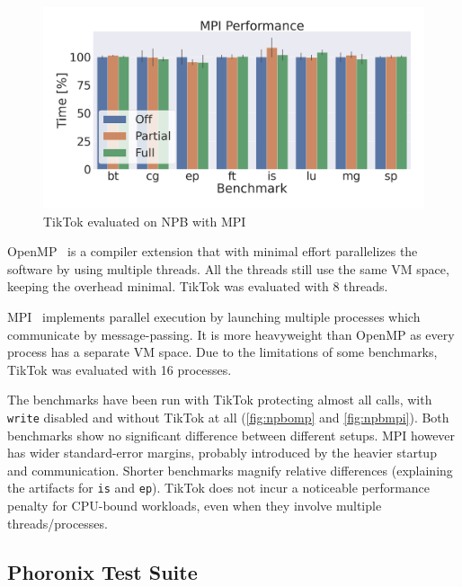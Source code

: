 \documentclass[conference]{IEEEtran}
\newcommand{\sysname}{TikTok}
\begin{document}
\begin{figure}[]
  \centering
  \includegraphics[width=\linewidth]{graphs/mpi.png}
  \caption{\sysname{} evaluated on NPB with MPI}
  \label{fig:npbmpi}
\end{figure}


OpenMP~\cite{dagum1998openmp} is a compiler extension that with minimal effort
parallelizes the software by using multiple threads. All the threads still use
the same VM space, keeping the overhead minimal. \sysname{} was evaluated with 8
threads.

MPI~\cite{snir1998mpi} implements parallel execution by launching multiple
processes which communicate by message-passing. It is more heavyweight than
OpenMP as every process has a separate VM space. Due to the limitations of some
benchmarks, \sysname{} was evaluated with 16 processes.

The benchmarks have been run with \sysname{} protecting almost all calls, with
\texttt{write} disabled and without \sysname{} at all (\autoref{fig:npbomp} and
\autoref{fig:npbmpi}). Both benchmarks show no significant difference between
different setups. MPI however has wider standard-error margins, probably
introduced by the heavier startup and communication. Shorter benchmarks magnify
relative differences (explaining the artifacts for \texttt{is} and \texttt{ep}).
\sysname{} does not incur a noticeable performance
penalty for CPU-bound workloads, even when they involve multiple
threads/processes.

\subsection{Phoronix Test Suite}
\label{subsec:phoronix}
\end{document}
